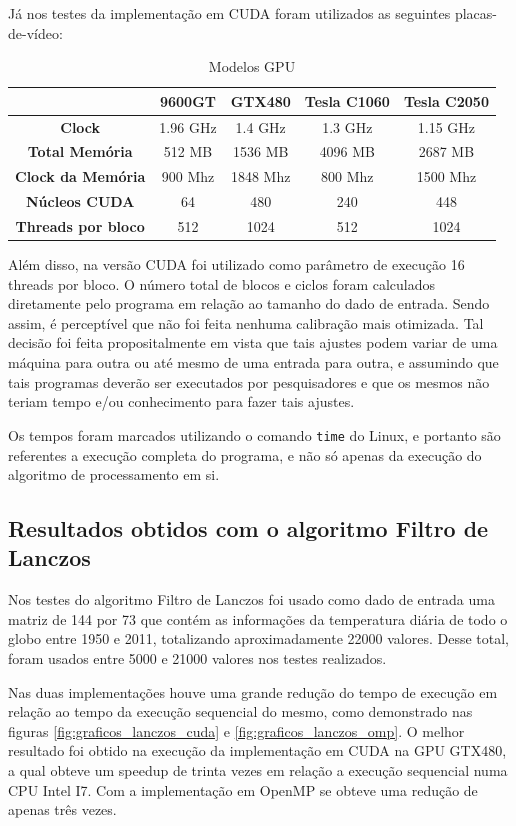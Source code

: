 Já nos testes da implementação em CUDA foram utilizados as seguintes placas-de-vídeo:

\begin{table}[H]
\caption{Modelos GPU}
\begin{center}
\begin{tabular}{ccccc}
 & \textbf{9600GT} & \textbf{GTX480} & \textbf{Tesla C1060} & \textbf{Tesla C2050}\\
\hline\hline
\textbf{Clock}				& 1.96 GHz	& 1.4 GHz 	& 1.3 GHz	& 1.15 GHz \\
\textbf{Total Memória}		& 512 MB		& 1536 MB	& 4096 MB	& 2687 MB \\
\textbf{Clock da Memória}	& 900 Mhz	& 1848 Mhz 	& 800 Mhz	& 1500 Mhz \\
\textbf{Núcleos CUDA}		& 64			& 480		& 240		& 448 \\
\textbf{Threads por bloco}	& 512		& 1024		& 512		& 1024
\end{tabular} 
\end{center}
\end{table}

Além disso, na versão CUDA foi utilizado como parâmetro de execução 16 threads por bloco. O número total de blocos e ciclos foram calculados diretamente pelo programa em relação ao tamanho do dado de entrada. Sendo assim, é perceptível que não foi feita nenhuma calibração mais otimizada. Tal decisão foi feita propositalmente em vista que tais ajustes podem variar de uma máquina para outra ou até mesmo de uma entrada para outra, e assumindo que tais programas deverão ser executados por pesquisadores e que os mesmos não teriam tempo e/ou conhecimento para fazer tais ajustes.

Os tempos foram marcados utilizando o comando \texttt{time} do Linux, e portanto são referentes a execução completa do programa, e não só apenas da execução do algoritmo de processamento em si.

\subsection{Resultados obtidos com o algoritmo Filtro de Lanczos}

Nos testes do algoritmo Filtro de Lanczos foi usado como dado de entrada uma matriz de 144 por 73 que contém as informações da temperatura diária de todo o globo entre 1950 e 2011, totalizando aproximadamente 22000 valores. Desse total, foram usados entre 5000 e 21000 valores nos testes realizados.

Nas duas implementações houve uma grande redução do tempo de execução em relação ao tempo da execução sequencial do mesmo, como demonstrado nas figuras \ref{fig:graficos_lanczos_cuda} e \ref{fig:graficos_lanczos_omp}. O melhor resultado foi obtido na execução da implementação em CUDA na GPU GTX480, a qual obteve um speedup de trinta vezes em relação a execução sequencial numa CPU Intel I7. Com a implementação em OpenMP se obteve uma redução de apenas três vezes.

